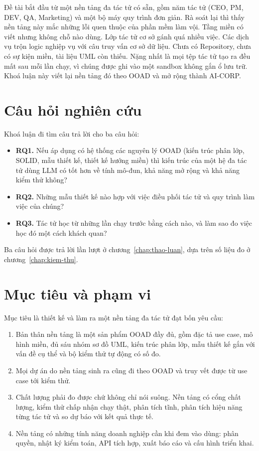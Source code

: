 Đề tài bắt đầu từ một nền tảng đa tác tử có sẵn, gồm năm tác tử (CEO, PM, DEV, QA, Marketing) và một bộ máy quy trình đơn giản. Rà soát lại thì thấy nền tảng này mắc những lỗi quen thuộc của phần mềm làm vội. Tầng miền có viết nhưng không chỗ nào dùng. Lớp tác tử cơ sở gánh quá nhiều việc. Các dịch vụ trộn logic nghiệp vụ với câu truy vấn cơ sở dữ liệu. Chưa có Repository, chưa có sự kiện miền, tài liệu UML còn thiếu. Nặng nhất là mọi tệp tác tử tạo ra đều mất sau mỗi lần chạy, vì chúng được ghi vào một sandbox không gắn ổ lưu trữ. Khoá luận này viết lại nền tảng đó theo OOAD và mở rộng thành AI-CORP.

\section{Câu hỏi nghiên cứu}

Khoá luận đi tìm câu trả lời cho ba câu hỏi:

\begin{itemize}
\item \textbf{RQ1.} Nếu áp dụng có hệ thống các nguyên lý OOAD (kiến trúc phân lớp, SOLID, mẫu thiết kế, thiết kế hướng miền) thì kiến trúc của một hệ đa tác tử dùng LLM có tốt hơn về tính mô-đun, khả năng mở rộng và khả năng kiểm thử không?
\item \textbf{RQ2.} Những mẫu thiết kế nào hợp với việc điều phối tác tử và quy trình làm việc của chúng?
\item \textbf{RQ3.} Tác tử học từ những lần chạy trước bằng cách nào, và làm sao đo việc học đó một cách khách quan?
\end{itemize}

Ba câu hỏi được trả lời lần lượt ở chương~\ref{chap:thao-luan}, dựa trên số liệu đo ở chương~\ref{chap:kiem-thu}.

\section{Mục tiêu và phạm vi}

Mục tiêu là thiết kế và làm ra một nền tảng đa tác tử đạt bốn yêu cầu:

\begin{enumerate}
\item Bản thân nền tảng là một sản phẩm OOAD đầy đủ, gồm đặc tả use case, mô hình miền, đủ sáu nhóm sơ đồ UML, kiến trúc phân lớp, mẫu thiết kế gắn với vấn đề cụ thể và bộ kiểm thử tự động có số đo.
\item Mọi dự án do nền tảng sinh ra cũng đi theo OOAD và truy vết được từ use case tới kiểm thử.
\item Chất lượng phải đo được chứ không chỉ nói suông. Nền tảng có cổng chất lượng, kiểm thử chấp nhận chạy thật, phân tích tĩnh, phân tích hiệu năng từng tác tử và so dự báo với kết quả thực tế.
\item Nền tảng có những tính năng doanh nghiệp cần khi đem vào dùng: phân quyền, nhật ký kiểm toán, API tích hợp, xuất báo cáo và cấu hình triển khai.
\end{enumerate}


